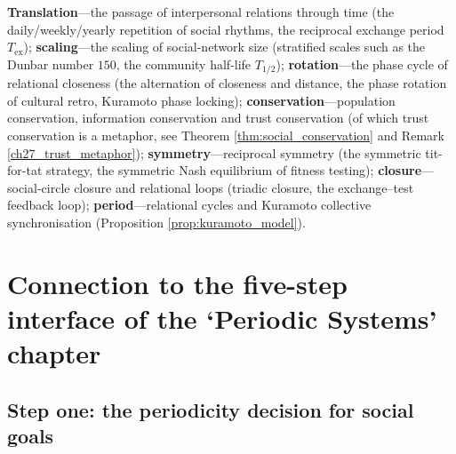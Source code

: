 \begin{remark}\label{rem:social_seven_themes}
\textbf{Translation}---the passage of interpersonal relations through time (the daily/weekly/yearly repetition of social rhythms, the reciprocal exchange period $T_{\text{ex}}$); \textbf{scaling}---the scaling of social-network size (stratified scales such as the Dunbar number $150$, the community half-life $T_{1/2}$); \textbf{rotation}---the phase cycle of relational closeness (the alternation of closeness and distance, the phase rotation of cultural retro, Kuramoto phase locking); \textbf{conservation}---population conservation, information conservation and trust conservation (of which trust conservation is a metaphor, see Theorem \ref{thm:social_conservation} and Remark \ref{ch27_trust_metaphor}); \textbf{symmetry}---reciprocal symmetry (the symmetric tit-for-tat strategy, the symmetric Nash equilibrium of fitness testing); \textbf{closure}---social-circle closure and relational loops (triadic closure, the exchange--test feedback loop); \textbf{period}---relational cycles and Kuramoto collective synchronisation (Proposition \ref{prop:kuramoto_model}).
\end{remark}

\section{Connection to the five-step interface of the `Periodic Systems' chapter}
\label{sec:social_five_steps}

\subsection{Step one: the periodicity decision for social goals}

